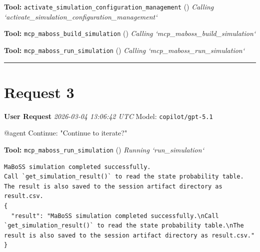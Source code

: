 \documentclass[11pt,a4paper]{article}
\begin{document}
\begin{toolokbox}
\textbf{Tool:} \texttt{activate\_simulation\_configuration\_management} (\checkmark)
\textit{Calling `activate\_simulation\_configuration\_management`}
\end{toolokbox}
\begin{toolokbox}
\textbf{Tool:} \texttt{mcp\_maboss\_build\_simulation} (\checkmark)
\textit{Calling `mcp\_maboss\_build\_simulation`}
\end{toolokbox}
\begin{toolokbox}
\textbf{Tool:} \texttt{mcp\_maboss\_run\_simulation} (\checkmark)
\textit{Calling `mcp\_maboss\_run\_simulation`}
\end{toolokbox}
\bigskip\hrule\bigskip
\section{Request 3}
\begin{userbox}
\textbf{User Request}
\quad \textit{2026-03-04 13:06:42 UTC}
\quad Model: \texttt{copilot/gpt-5.1}

@agent Continue: "Continue to iterate?"

\end{userbox}
\begin{toolokbox}
\textbf{Tool:} \texttt{mcp\_maboss\_run\_simulation} (\checkmark)
\textit{Running `run\_simulation`}
\begin{lstlisting}
MaBoSS simulation completed successfully.
Call `get_simulation_result()` to read the state probability table.
The result is also saved to the session artifact directory as result.csv.
{
  "result": "MaBoSS simulation completed successfully.\nCall `get_simulation_result()` to read the state probability table.\nThe result is also saved to the session artifact directory as result.csv."
}
\end{lstlisting}
\end{toolokbox}
\end{document}
